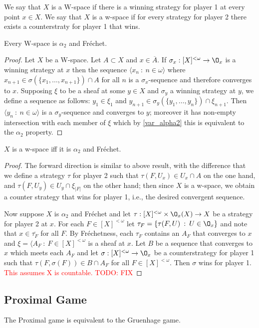 \documentclass{article}
\begin{document}
\begin{defn}
    We say that \(X\) is a W-space if there is a winning strategy for player 1 at every point \(x \in X\).  We say that \(X\) is a w-space if for every strategy for player 2 there exists a counterstraty for player 1 that wins.
\end{defn}
\begin{prop}
    Every W-space is \(\alpha_2\) and Fréchet.
\end{prop}
\begin{proof}
    Let \(X\) be a W-space. Let \(A \subset X\) and \(x \in \overline{A}\). If \(\sigma_x: [X]^{<\omega} \to \O_x\) is a winning strategy at \(x\) then the sequence \(\langle x_n \: : \: n \in \omega\rangle\) where \(x_{n + 1} \in \sigma(\{x_1, \dots, x_{n + 1}\})\cap A\) for all \(n\) is a \(\sigma_x\)-sequence and therefore converges to \(x\). Supposing \(\xi\) to be a sheaf at some \(y \in X\) and \(\sigma_y\) a winning strategy at \(y\), we define a sequence as follows: \(y_1 \in \xi_1\) and \(y_{n + 1} \in \sigma_y(\{y_1, \dots, y_n\}) \cap \xi_{n + 1}\). Then \(\langle y_n \: : \: n \in \omega\rangle\) is a \(\sigma_y\)-sequence and converges to \(y\); moreover it has non-empty intersection with each member of \(\xi\) which by \ref{var_alpha2} this is equivalent to the \(\alpha_2\) property.
\end{proof}
\begin{prop}
    \(X\) is a w-space iff it is  \(\alpha_2\) and Fréchet.
\end{prop}
\begin{proof}
    The forward direction is similar to above result, with the difference that we define a strategy \(\tau\) for player 2 such that \(\tau(F, U_x) \in U_x \cap A\) on the one hand, and \(\tau(F, U_y) \in U_y \cap \xi_{|F|}\) on the other hand; then since \(X\) is a w-space, we obtain a counter strategy that wins for player 1, i.e., the desired convergent sequence.

    Now suppose \(X\) is \(\alpha_2\) and Fréchet and let \(\tau: [X]^{<\omega} \times \O_x(X) \to X\) be a strategy for player 2 at \(x\). For each \(F \in [X]^{<\omega}\) let \(\tau_F = \{\tau(F, U) \: : \: U \in \O_x\}\) and note that \(x \in \overline{\tau_F}\) for all \(F\). By Fréchetness, each \(\tau_F\) contains an \(A_F\) that converges to \(x\) and \(\xi = \langle A_F \: : \: F \in [X]^{<\omega}\) is a sheaf at \(x\). Let \(B\) be a sequence that converges to \(x\) which meets each \(A_F\) and let \(\sigma: [X]^{< \omega} \to \O_x\) be a counterstrategy for player 1 such that \(\tau(F, \sigma(F)) \in B \cap A_F\) for all \(F \in [X]^{< \omega}\). Then \(\sigma\) wins for player 1. \textcolor{red}{This assumes X is countable. TODO: FIX}
    
\end{proof}

\subsection{Proximal Game}


\begin{prop}
    The Proximal game is equivalent to the Gruenhage game.
\end{prop}


%
\end{document}
